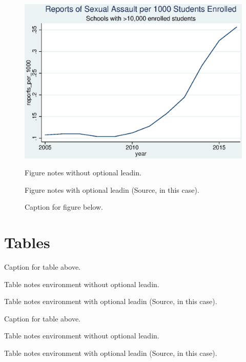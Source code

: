 \documentclass[AER]{AEA}
\begin{document}
\begin{figure}

\includegraphics[width=4.9in]{figures/school_reports.eps}

\caption{Caption for figure below.}
\begin{figurenotes}
Figure notes without optional leadin.
\end{figurenotes}
\begin{figurenotes}[Source]
Figure notes with optional leadin (Source, in this case).
\end{figurenotes}
\end{figure}

\section{Tables}

\begin{table}
\caption{Caption for table above.}



\begin{tablenotes}
Table notes environment without optional leadin.
\end{tablenotes}
\begin{tablenotes}[Source]
Table notes environment with optional leadin (Source, in this case).
\end{tablenotes}
\end{table}

\begin{table}
\caption{Caption for table above.}



\begin{tablenotes}
Table notes environment without optional leadin.
\end{tablenotes}
\begin{tablenotes}[Source]
Table notes environment with optional leadin (Source, in this case).
\end{tablenotes}
\end{table}
\end{document}
